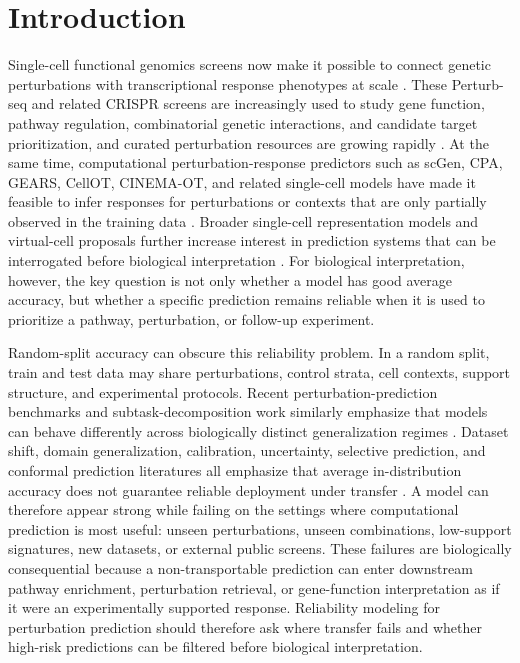 \section{Introduction}

Single-cell functional genomics screens now make it possible to connect genetic perturbations with transcriptional response phenotypes at scale \citep{dixit2016perturbseq,adamson2016parseq,datlinger2017pooled,xie2017multiplexed,norman2019manifolds,srivatsan2020sciplex,datlinger2021ultra,papalexi2021eccite,frangieh2021multimodal,replogle2022genome,peidli2024scperturb}. These Perturb-seq and related CRISPR screens are increasingly used to study gene function, pathway regulation, combinatorial genetic interactions, and candidate target prioritization, and curated perturbation resources are growing rapidly \citep{perturbase2025,perturbdb2025}. At the same time, computational perturbation-response predictors such as scGen, CPA, GEARS, CellOT, CINEMA-OT, and related single-cell models have made it feasible to infer responses for perturbations or contexts that are only partially observed in the training data \citep{lotfollahi2019scgen,lotfollahi2023cpa,roohani2023gears,bunne2023cellot,dong2023cinemaot}. Broader single-cell representation models and virtual-cell proposals further increase interest in prediction systems that can be interrogated before biological interpretation \citep{lopez2018scvi,gayoso2022scvitools,theodoris2023geneformer,cui2024scgpt,bunne2024virtualcell}. For biological interpretation, however, the key question is not only whether a model has good average accuracy, but whether a specific prediction remains reliable when it is used to prioritize a pathway, perturbation, or follow-up experiment.

Random-split accuracy can obscure this reliability problem. In a random split, train and test data may share perturbations, control strata, cell contexts, support structure, and experimental protocols. Recent perturbation-prediction benchmarks and subtask-decomposition work similarly emphasize that models can behave differently across biologically distinct generalization regimes \citep{generalizable2025benchmark,stamp2024}. Dataset shift, domain generalization, calibration, uncertainty, selective prediction, and conformal prediction literatures all emphasize that average in-distribution accuracy does not guarantee reliable deployment under transfer \citep{zhou2022dgsurvey,koh2021wilds,ovadia2019uncertainty,guo2017calibration,hendrycks2016ood,geifman2017selective,vovk2005algorithmic,angelopoulos2021conformal}. A model can therefore appear strong while failing on the settings where computational prediction is most useful: unseen perturbations, unseen combinations, low-support signatures, new datasets, or external public screens. These failures are biologically consequential because a non-transportable prediction can enter downstream pathway enrichment, perturbation retrieval, or gene-function interpretation as if it were an experimentally supported response. Reliability modeling for perturbation prediction should therefore ask where transfer fails and whether high-risk predictions can be filtered before biological interpretation.


